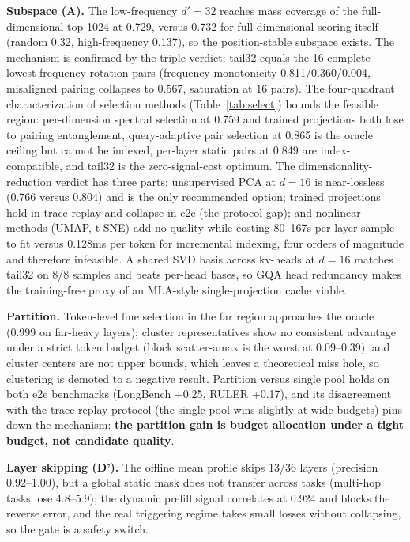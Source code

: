 \documentclass[11pt]{article}
\begin{document}
\textbf{Subspace (A).} The low-frequency $d'{=}32$ reaches mass coverage of the full-dimensional top-1024 at 0.729, versus 0.732 for full-dimensional scoring itself (random 0.32, high-frequency 0.137), so the position-stable subspace exists. The mechanism is confirmed by the triple verdict: tail32 equals the 16 complete lowest-frequency rotation pairs (frequency monotonicity 0.811/0.360/0.004, misaligned pairing collapses to 0.567, saturation at 16 pairs). The four-quadrant characterization of selection methods (Table~\ref{tab:select}) bounds the feasible region: per-dimension spectral selection at 0.759 and trained projections both lose to pairing entanglement, query-adaptive pair selection at 0.865 is the oracle ceiling but cannot be indexed, per-layer static pairs at 0.849 are index-compatible, and tail32 is the zero-signal-cost optimum. The dimensionality-reduction verdict has three parts: unsupervised PCA at $d{=}16$ is near-lossless (0.766 versus 0.804) and is the only recommended option; trained projections hold in trace replay and collapse in e2e (the protocol gap); and nonlinear methods (UMAP, t-SNE) add no quality while costing 80--167s per layer-sample to fit versus 0.128ms per token for incremental indexing, four orders of magnitude and therefore infeasible. A shared SVD basis across kv-heads at $d{=}16$ matches tail32 on 8/8 samples and beats per-head bases, so GQA head redundancy makes the training-free proxy of an MLA-style single-projection cache viable.

\textbf{Partition.} Token-level fine selection in the far region approaches the oracle (0.999 on far-heavy layers); cluster representatives show no consistent advantage under a strict token budget (block scatter-amax is the worst at 0.09--0.39), and cluster centers are not upper bounds, which leaves a theoretical miss hole, so clustering is demoted to a negative result. Partition versus single pool holds on both e2e benchmarks (LongBench +0.25, RULER +0.17), and its disagreement with the trace-replay protocol (the single pool wins slightly at wide budgets) pins down the mechanism: \textbf{the partition gain is budget allocation under a tight budget, not candidate quality}.

\textbf{Layer skipping (D').} The offline mean profile skips 13/36 layers (precision 0.92--1.00), but a global static mask does not transfer across tasks (multi-hop tasks lose 4.8--5.9); the dynamic prefill signal correlates at 0.924 and blocks the reverse error, and the real triggering regime takes small losses without collapsing, so the gate is a safety switch.
\end{document}

